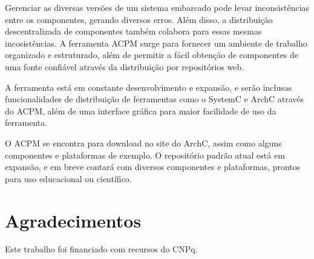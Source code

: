 \documentclass[12pt]{article}
\begin{document}
Gerenciar as diversas versões de um sistema embarcado pode levar inconsistências
entre os componentes, gerando diversos erros. Além disso, a distribuição
descentralizada de componentes também colabora para essas mesmas incosistências.
A ferramenta ACPM surge para fornecer um ambiente de trabalho organizado e
estruturado, além de permitir a fácil obtenção de componentes de uma fonte
confiável através da distribuição por repositórios web.

A ferramenta está em constante desenvolvimento e expansão, e serão inclusas
funcionalidades de distribuição de ferramentas como o SystemC e ArchC através
do ACPM, além de uma interface gráfica para maior facilidade de uso da
ferramenta. 

O ACPM se encontra para download no site do ArchC, assim como alguns componentes
e plataformas de exemplo. O repositório padrão atual está em expansão, e em
breve contará com diversos componentes e plataformas, prontos para uso
educacional ou científico.


\section{Agradecimentos}

Este trabalho foi financiado com recursos do CNPq.




\end{document}
